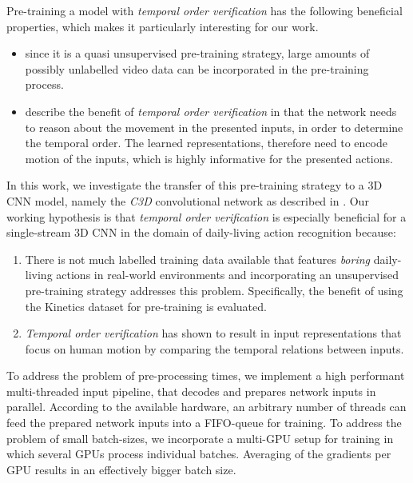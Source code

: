 Pre-training a model with \textit{temporal order verification} has the following beneficial properties, which makes it particularly interesting for our work.
\begin{itemize}
    \item 
    since it is a quasi unsupervised pre-training strategy, large amounts of possibly unlabelled video data can be incorporated in the pre-training process.
    \item
    \textcite{misra_shuffle_2016} describe the benefit of \textit{temporal order verification} in that the network needs to reason about the movement in the presented inputs, in order to determine the temporal order.
    The learned representations, therefore need to encode motion of the inputs, which is highly informative for the presented actions.
\end{itemize}

In this work, we investigate the transfer of this pre-training strategy to a 3D CNN model, namely the \textit{C3D} convolutional network as described in \cite{tran_learning_2015}.
Our working hypothesis is that \textit{temporal order verification} is especially beneficial for a single-stream 3D CNN in the domain of daily-living action recognition because:
\begin{enumerate}
    \item
    There is not much labelled training data available that features \textit{boring} daily-living actions in real-world environments and incorporating an unsupervised pre-training strategy addresses this problem.
    Specifically, the benefit of using the Kinetics dataset for pre-training is evaluated.
    \item 
    \textit{Temporal order verification} has shown to result in input representations that focus on human motion by comparing the temporal relations between inputs.
\end{enumerate}

To address the problem of pre-processing times, we implement a high performant multi-threaded input pipeline, that decodes and prepares network inputs in parallel.
According to the available hardware, an arbitrary number of threads can feed the prepared network inputs into a FIFO-queue for training.
To address the problem of small batch-sizes, we incorporate a multi-GPU setup for training in which several GPUs process individual batches. Averaging of the gradients per GPU results in an effectively bigger batch size.


\newpage
